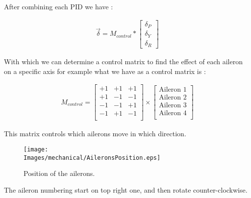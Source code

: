 After combining each PID we have :

\begin{gather*}
    \overrightarrow{\delta} = M_{control} *
    \begin{bmatrix}
        \delta_P \\
        \delta_Y \\
        \delta_R
    \end{bmatrix}
\end{gather*}

With which we can determine a control matrix to find the effect of each aileron
on a specific axis for example what we have as a control matrix is :

\begin{gather*}
    M_{control} =
    \begin{bmatrix}
        +1 & +1 & +1 \\
        +1 & -1 & -1 \\
        -1 & -1 & +1 \\
        -1 & +1 & -1 \\
    \end{bmatrix}
    \times
    \begin{bmatrix}
        \text{Aileron 1} \\
        \text{Aileron 2} \\
        \text{Aileron 3} \\
        \text{Aileron 4} \\
    \end{bmatrix}
\end{gather*}

This matrix controls which ailerons move in which direction.

\begin{figure}[!hbt]
    \centering
    \texttt{[image: \\Images/mechanical/AileronsPosition.eps]}
    \caption{Position of the ailerons.}
\end{figure}
\FloatBarrier

The aileron numbering start on top right one, and then rotate counter-clockwise.